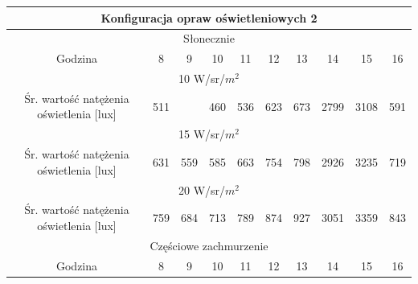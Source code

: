 \documentclass[a4paper,12pt]{article}
\begin{document}
	\begin{table}[!ht]
		\begin{tabular}{|c|c|c|c|c|c|c|c|c|c|}

			\hline
			\multicolumn{10}{|c|}{\cellcolor[HTML]{C8DFC8}Konfiguracja opraw oświetleniowych 2} \\ \hline
		
			\multicolumn{10}{|c|}{\cellcolor[HTML]{EDD9A0}Słonecznie} \\ \hline
			Godzina & \cellcolor[HTML]{FFFFFF}8 & \cellcolor[HTML]{FFFFFF}9 & \cellcolor[HTML]{FFFFFF}10 & \cellcolor[HTML]{FFFFFF}11 & \cellcolor[HTML]{FFFFFF}12 & \cellcolor[HTML]{FFFFFF}13 & \cellcolor[HTML]{FFFFFF}14 & \cellcolor[HTML]{FFFFFF}15 & \cellcolor[HTML]{FFFFFF}16 \\ \hline
	
			\multicolumn{10}{|c|}{10 W/sr/$m^{2}$} \\ \hline
			Śr. wartość natężenia oświetlenia {[}lux{]} & \cellcolor[HTML]{F6E9C3}511 & \cellcolor[HTML]{F6E9C3}{\color[HTML]{000000} 435} & \cellcolor[HTML]{F6E9C3}460 & \cellcolor[HTML]{F6E9C3}536 & \cellcolor[HTML]{F6E9C3}623 & \cellcolor[HTML]{F6E9C3}673 & \cellcolor[HTML]{F6E9C3}2799 & \cellcolor[HTML]						{F6E9C3}3108 & \cellcolor[HTML]{F6E9C3}591 \\ \hline
	
			\multicolumn{10}{|c|}{15 W/sr/$m^{2}$} \\ \hline
			Śr. wartość natężenia oświetlenia {[}lux{]} & \cellcolor[HTML]{F6E9C3}631 & \cellcolor[HTML]{F6E9C3}559 & \cellcolor[HTML]{F6E9C3}585 & \cellcolor[HTML]{F6E9C3}663 & \cellcolor[HTML]{F6E9C3}754 & \cellcolor[HTML]{F6E9C3}798 & \cellcolor[HTML]{F6E9C3}2926 & \cellcolor[HTML]{F6E9C3}3235 & 							\cellcolor[HTML]{F6E9C3}719 \\ \hline
	
			\multicolumn{10}{|c|}{20 W/sr/$m^{2}$} \\ \hline
			Śr. wartość natężenia oświetlenia {[}lux{]} & \cellcolor[HTML]{F6E9C3}759 & \cellcolor[HTML]{F6E9C3}684 & \cellcolor[HTML]{F6E9C3}713 & \cellcolor[HTML]{F6E9C3}789 & \cellcolor[HTML]{F6E9C3}874 & \cellcolor[HTML]{F6E9C3}927 & \cellcolor[HTML]{F6E9C3}3051 & \cellcolor[HTML]{F6E9C3}3359 & 							\cellcolor[HTML]{F6E9C3}843 \\ \hline
	
			\multicolumn{10}{|c|}{\cellcolor[HTML]{B2BFE5}Częściowe zachmurzenie} \\ \hline
			Godzina & \cellcolor[HTML]{FFFFFF}8 & \cellcolor[HTML]{FFFFFF}9 & \cellcolor[HTML]{FFFFFF}10 & \cellcolor[HTML]{FFFFFF}11 & \cellcolor[HTML]{FFFFFF}12 & \cellcolor[HTML]{FFFFFF}13 & \cellcolor[HTML]{FFFFFF}14 & \cellcolor[HTML]{FFFFFF}15 & \cellcolor[HTML]{FFFFFF}16 \\ \hline
	

\end{tabular}
\end{table}
\end{document}
